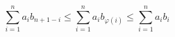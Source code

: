 $$
\sum_{i=1}^{n} a_{i}b_{n+1-i} \le \sum_{i=1}^{n} a_{i}b_{\varphi(i)} \le \sum_{i=1}^{n} a_{i}b_{i}
$$



